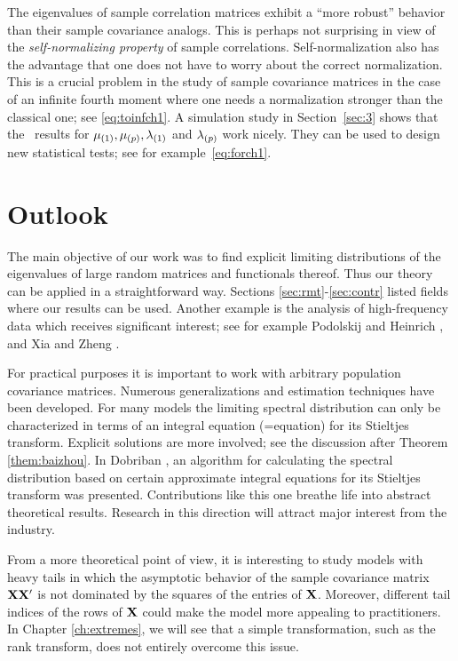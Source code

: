 The eigenvalues of sample correlation matrices exhibit a  ``more robust'' behavior than their sample covariance analogs. 
This is perhaps not surprising in view of the {\em self-normalizing property} of sample correlations.
Self-normalization also has the advantage that one does not have to worry about the correct normalization.
This is a crucial problem in the study of sample covariance matrices in the case of an infinite fourth moment 
where one needs a normalization stronger than the classical one; see \eqref{eq:toinfch1}.
A simulation study in Section~\ref{sec:3} shows that the \asy\ results for $\mu_{(1)}, \mu_{(p)}, \lambda_{(1)}$ and $\lambda_{(p)}$ work nicely.
They can be used to design new statistical tests; see for example~\eqref{eq:forch1}.


\section{Outlook}

The main objective of our work was to find explicit limiting distributions of the eigenvalues of large random matrices and functionals thereof. Thus our theory can be applied in a straightforward way. Sections \ref{sec:rmt}-\ref{sec:contr} listed fields where our results can be used. Another example is the analysis of high-frequency data which receives significant interest; see for example Podolskij and Heinrich \cite{heinrich:podolskij:2014}, and  Xia and Zheng \cite{xia:zheng:2014,xia:zheng:2016}.


For practical purposes it is important to work with arbitrary population covariance matrices. Numerous generalizations and estimation techniques have been developed. For many models the limiting spectral distribution can only be characterized in terms of an integral equation (=\MP equation) for its Stieltjes transform. Explicit solutions are more involved; see the discussion after Theorem \ref{them:baizhou}. 
In Dobriban \cite{dobriban:2015}, an algorithm for calculating the spectral distribution based on certain approximate integral equations for its Stieltjes transform was presented. Contributions like this one breathe life into abstract theoretical results. Research in this direction will attract major interest from the industry. 

From a more theoretical point of view, it is interesting to study models with heavy tails in which the asymptotic behavior of the sample covariance matrix ${\mathbf X}{\mathbf X}'$ is not dominated by the squares of the entries of ${\mathbf X}$. Moreover, different tail indices of the rows of ${\mathbf X}$ could make the model more appealing to practitioners. In Chapter \ref{ch:extremes}, we will see that a simple transformation, such as the rank transform, does not entirely overcome this issue.

